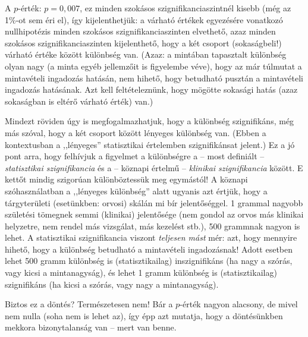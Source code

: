 \documentclass[
]{book}
\begin{document}
A \(p\)-érték: \(p=0,\!007\), ez minden szokásos szignifikanciaszintnél kisebb (még az 1\%-ot sem éri el), így kijelenthetjük: a várható értékek egyezésére vonatkozó nullhipotézis minden szokásos szignifikanciaszinten elvethető, azaz minden szokásos szignifikanciaszinten kijelenthető, hogy a két csoport (sokaságbeli!) várható értéke között különbség van. (Azaz: a mintában tapasztalt különbség olyan nagy (a minta egyéb jellemzőit is figyelembe véve), hogy az már túlmutat a mintavételi ingadozás hatásán, nem hihető, hogy betudható pusztán a mintavételi ingadozás hatásának. Azt kell feltételeznünk, hogy mögötte sokasági hatás (azaz sokaságban is eltérő várható érték) van.)

Mindezt röviden úgy is megfogalmazhatjuk, hogy a különbség szignifikáns, még más szóval, hogy a két csoport között lényeges különbség van. (Ebben a kontextusban a ,,lényeges'' statisztikai értelemben szignifikánsat jelent.) Ez a jó pont arra, hogy felhívjuk a figyelmet a különbségre a -- most definiált -- \emph{statisztikai szignifikancia} és a -- köznapi értelmű -- \emph{klinikai szignifikancia} között. E kettőt mindig szigorúan különböztessük meg egymástól! A köznapi szóhasználatban a ,,lényeges különbség'' alatt ugyanis azt értjük, hogy a tárgyterületi (esetünkben: orvosi) skálán mi bír jelentőséggel. 1 grammal nagyobb születési tömegnek semmi (klinikai) jelentősége (nem gondol az orvos más klinikai helyzetre, nem rendel más vizsgálat, más kezelést stb.), 500 grammnak nagyon is lehet. A statisztikai szignifikancia viszont \emph{teljesen mást} mér: azt, hogy mennyire hihető, hogy a különbség betudható a mintavételi ingadozásnak! Adott esetben lehet 500 gramm különbség is (statisztikailag) inszignifikáns (ha nagy a szórás, vagy kicsi a mintanagyság), és lehet 1 gramm különbség is (statisztikailag) szignifikáns (ha kicsi a szórás, vagy nagy a mintanagyság).

Biztos ez a döntés? Természetesen nem! Bár a \(p\)-érték nagyon alacsony, de mivel nem nulla (soha nem is lehet az), így épp azt mutatja, hogy a döntésünkben mekkora bizonytalanság van -- mert van benne.

\backmatter
\end{document}
